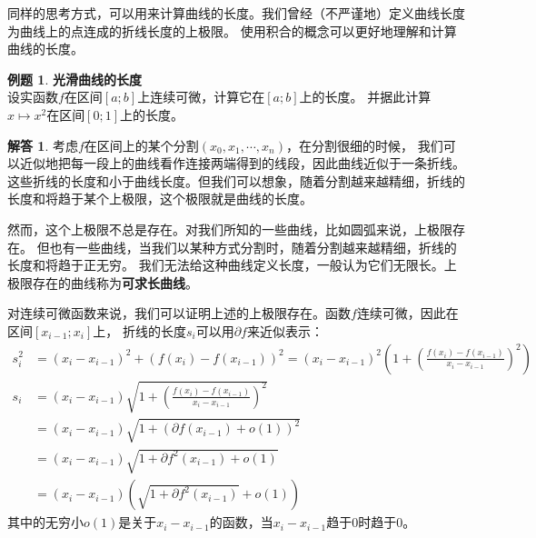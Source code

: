 \documentclass[12pt,UTF8]{ctexbook}
\newcommand{\olim}[1]{\mathit{o}\left(#1\right)}  %
\theoremstyle{definition}
\newtheorem{et}{例题}[section]
\newtheorem*{so}{解答}
\theoremstyle{plain}
\begin{document}
同样的思考方式，可以用来计算曲线的长度。我们曾经（不严谨地）定义曲线长度为曲线上的点连成的折线长度的上极限。
使用积合的概念可以更好地理解和计算曲线的长度。

\begin{et}{\textbf{光滑曲线的长度}}\\
    设实函数$f$在区间$[a;b]$上连续可微，计算它在$[a;b]$上的长度。
    并据此计算$x\mapsto x^2$在区间$[0;1]$上的长度。    
\end{et}

\begin{so}
    考虑$f$在区间上的某个分割$(x_0, x_1, \cdots, x_n)$，在分割很细的时候，
    我们可以近似地把每一段上的曲线看作连接两端得到的线段，因此曲线近似于一条折线。
    这些折线的长度和小于曲线长度。但我们可以想象，随着分割越来越精细，折线的长度和将趋于某个上极限，这个极限就是曲线的长度。

    然而，这个上极限不总是存在。对我们所知的一些曲线，比如圆弧来说，上极限存在。
    但也有一些曲线，当我们以某种方式分割时，随着分割越来越精细，折线的长度和将趋于正无穷。
    我们无法给这种曲线定义长度，一般认为它们无限长。上极限存在的曲线称为\textbf{可求长曲线}。

    对连续可微函数来说，我们可以证明上述的上极限存在。函数$f$连续可微，因此在区间$[x_{i-1};x_i]$上，
    折线的长度$s_i$可以用$\partial f$来近似表示：
    \begin{align*}
        s_i^2 &= (x_i - x_{i-1})^2 + (f(x_i) - f(x_{i-1}))^2 = (x_i - x_{i-1})^2\left( 1 + \left(\frac{f(x_i) - f(x_{i-1})}{x_i - x_{i-1}}\right)^2\right) \\
        s_i &= (x_i - x_{i-1})\sqrt{1 + \left(\frac{f(x_i) - f(x_{i-1})}{x_i - x_{i-1}}\right)^2} \\
        &= (x_i - x_{i-1})\sqrt{1 + \left(\partial f(x_{i-1}) + \olim{1}\right)^2}\\
        &= (x_i - x_{i-1})\sqrt{1 + \partial f^2(x_{i-1}) + \olim{1}}\\
        &= (x_i - x_{i-1})\left(\sqrt{1 + \partial f^2(x_{i-1})} + \olim{1}\right)
    \end{align*}
    其中的无穷小$\olim{1}$是关于$x_i - x_{i-1}$的函数，当$x_i - x_{i-1}$趋于$0$时趋于$0$。


\end{so}
\end{document}
